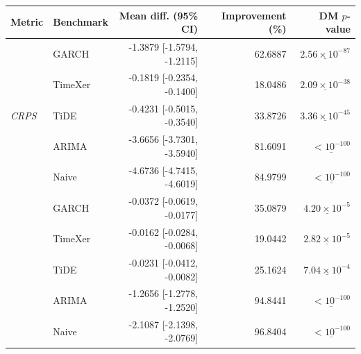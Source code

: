 \begin{tabular}{llrrr}
\toprule
Metric & Benchmark & Mean diff. (95\% CI) & Improvement (\%) & DM $p$-value \\
\midrule
\multirow{5}{*}{\textit{CRPS}}
 & GARCH & -1.3879 [-1.5794, -1.2115] & 62.6887 & $\underline{2.56 \times 10^{-87}}$ \\
 & TimeXer & -0.1819 [-0.2354, -0.1400] & 18.0486 & $\underline{2.09 \times 10^{-38}}$ \\
 & TiDE & -0.4231 [-0.5015, -0.3540] & 33.8726 & $\underline{3.36 \times 10^{-45}}$ \\
 & ARIMA & -3.6656 [-3.7301, -3.5940] & 81.6091 & $\underline{< 10^{-100}}$ \\
 & Naive & -4.6736 [-4.7415, -4.6019] & 84.9799 & $\underline{< 10^{-100}}$ \\
\addlinespace \midrule
\multirow{5}{*}{\textit{twCRPS}}
 & GARCH & -0.0372 [-0.0619, -0.0177] & 35.0879 & $\underline{4.20 \times 10^{-5}}$ \\
 & TimeXer & -0.0162 [-0.0284, -0.0068] & 19.0442 & $\underline{2.82 \times 10^{-5}}$ \\
 & TiDE & -0.0231 [-0.0412, -0.0082] & 25.1624 & $\underline{7.04 \times 10^{-4}}$ \\
 & ARIMA & -1.2656 [-1.2778, -1.2520] & 94.8441 & $\underline{< 10^{-100}}$ \\
 & Naive & -2.1087 [-2.1398, -2.0769] & 96.8404 & $\underline{< 10^{-100}}$ \\
\bottomrule
\end{tabular}